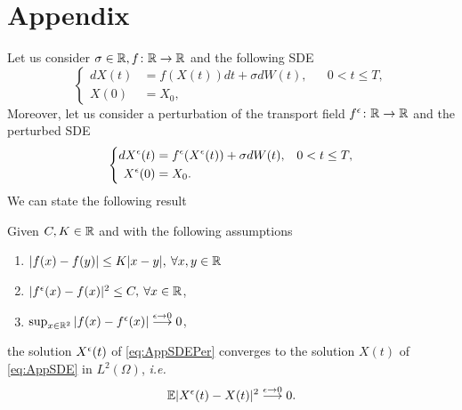 \section{Appendix}

Let us consider $\sigma \in \mathbb{R}, f\colon \mathbb{R} \rightarrow \mathbb{R}$ and the following SDE
\begin{equation}\label{eq:AppSDE}
\left \{
\begin{aligned}
	dX(t) &= f(X(t))dt + \sigma dW(t), && 0 < t \leq T, \\
	X(0) &= X_0,
\end{aligned} \right .
\end{equation}
Moreover, let us consider a perturbation of the transport field $f^\epsilon\colon \mathbb{R} \rightarrow \mathbb{R} $ and the perturbed SDE 
\begin{equation}\label{eq:AppSDEPer}
\left \{
\begin{aligned}
	dX^\epsilon(t) &= f^\epsilon(X^\epsilon(t)) + \sigma dW(t), && 0 < t \leq T, \\
	X^\epsilon(0) &= X_0.
\end{aligned} \right .
\end{equation}
We can state the following result
\begin{theorem} Given $C,K \in \mathbb{R}$ and with the following assumptions
\begin{enumerate}
	\item $|f(x) - f(y)| \leq K|x - y|, \: \forall x,y \in \mathbb{R}$
	\item $|f^\epsilon (x) - f(x)|^2 \leq C, \: \forall x \in \mathbb{R}$,
 	\item $\sup_{x\in \mathbb{R}^2}|f(x) - f^\epsilon(x)| \stackrel{\epsilon \rightarrow 0}\longrightarrow 0$,
\end{enumerate}
the solution $X^\epsilon(t)$ of \eqref{eq:AppSDEPer} converges to the solution $X(t)$ of \eqref{eq:AppSDE} in $L^2(\Omega)$, \textit{i.e.}
\begin{equation*}
	\mathbb{E} |X^\epsilon(t) - X(t)|^2 \stackrel{\epsilon \rightarrow 0}\longrightarrow 0.
\end{equation*}
\end{theorem}

